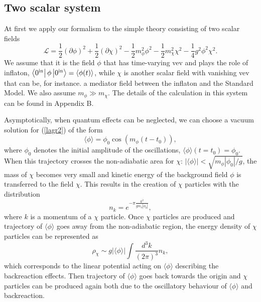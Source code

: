 \documentclass[twocolumn,showpacs,preprintnumbers,amsmath,amssymb,nofootinbib,superscriptaddress,prc]{revtex4}
\begin{document}
\subsection{Two scalar system}

At first we apply our formalism to the simple theory consisting of two scalar fields
\begin{equation}
 \mathcal{L} = \frac{1}{2}(\partial \phi)^2 + \frac{1}{2}(\partial \chi)^2
   - \frac{1}{2}m_\phi^2 \phi^2 - \frac{1}{2}m_\chi^2 \chi^2 - \frac{1}{4}g^2\phi^2\chi^2. \label{lagr2}
\end{equation}
We assume that it is the field $\phi$ that has time-varying vev and plays the role of inflaton, $ \left<0^{\rm in}\right|\phi\left|0^{\rm in}\right>=\left<\phi(t)\right>$, while $\chi$ is another scalar field with vanishing vev that can be, for instance. a mediator field between the inflaton and the Standard Model. We also assume $m_\phi \gg m_\chi$. The details of the calculation in this system can be found in Appendix B.

Asymptotically, when quantum effects can be neglected, we can choose a vacuum solution for (\ref{lagr2}) of the form
\begin{equation}
\langle \phi \rangle = \phi_0 \cos (m_{\phi} (t-t_0)),
\end{equation}
where $\phi_0$ denotes the initial amplitude of the oscillations, $\langle \phi \rangle (t=t_0) = \phi_0$. When this trajectory crosses the non-adiabatic area for $\chi$:  $ |\langle \phi \rangle| < \sqrt{m_{\phi} |\phi_0|/g}$, the mass of $\chi$ becomes very small and kinetic energy of the background field $\phi$ is transferred to the field $\chi$. This results in the creation of $\chi$ particles with the distribution \citep{Kofman:2004yc}
\begin{equation}
n_k = e^{-\pi \frac{k^2}{g m_{\phi} |\phi_0|}},
\end{equation}
where $k$ is a momentum of a $\chi$ particle. Once $\chi$ particles are produced and trajectory of $\langle \phi \rangle$ goes away from the non-adiabatic region, the energy density of $\chi$ particles can be represented as 
\begin{equation}
\rho_{\chi} \sim g |\langle \phi \rangle| \int \frac{d^3 k}{(2 \pi)^3} n_k,
\end{equation}
which corresponds to the linear potential acting on $\langle \phi \rangle$ describing the backreaction effects. Then trajectory of $\langle \phi \rangle$ goes back towards the origin and $\chi$ particles can be produced again both due to the  oscillatory behaviour of $\langle \phi \rangle $ and backreaction.
\end{document}
